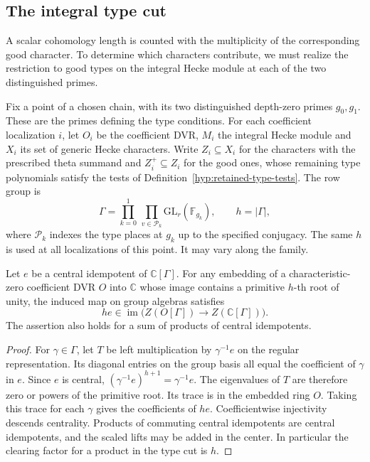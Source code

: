 \subsection{The integral type cut}\label{subsec:selected-cut}
\hypertarget{source-selected-cut}{}

A scalar cohomology length is counted with the multiplicity of the corresponding good character. To determine which characters contribute, we must realize the restriction to good types on the integral Hecke module at each of the two distinguished primes.

\begin{definition}\label{def:localized-type-support}
Fix a point of a chosen chain, with its two distinguished depth-zero
primes \(g_0,g_1\). These are the primes defining the type conditions.
For each coefficient localization \(i\), let \(O_i\) be the coefficient
DVR, \(M_i\) the integral Hecke module and \(X_i\) its set of generic
Hecke characters. Write \(Z_i\subseteq X_i\) for the characters with
the prescribed theta summand and \(Z_i^+\subseteq Z_i\) for the good
ones, whose remaining type polynomials satisfy the tests of Definition~\ref{hyp:retained-type-tests}. The row group is
\[
 \Gamma=\prod_{k=0}^1\,\prod_{v\in\mathcal P_k}
              \mathrm{GL}_r(\mathbb F_{g_k}),\qquad h=|\Gamma|,
\]
where \(\mathcal P_k\) indexes the type places at \(g_k\) up to the
specified conjugacy. The same \(h\) is used at all localizations of
this point. It may vary along the family.
\end{definition}

\begin{lemma}\label{lem:integral-central}
Let \(e\) be a central idempotent of \(\mathbb C[\Gamma]\). For any
embedding of a characteristic-zero coefficient DVR \(O\) into \(\mathbb C\) whose image contains a primitive \(h\)-th root of unity, the induced map on group algebras satisfies
\[
 he\in\operatorname{im}\bigl(Z(O[\Gamma])\longrightarrow Z(\mathbb C[\Gamma])\bigr).
\]
The assertion also holds for a sum of products of central
idempotents.
\end{lemma}

\begin{proof}
For \(\gamma\in\Gamma\), let \(T\) be left multiplication by
\(\gamma^{-1}e\) on the regular representation. Its diagonal entries
on the group basis all equal the coefficient of \(\gamma\) in \(e\).
Since \(e\) is central, \((\gamma^{-1}e)^{h+1}=\gamma^{-1}e\).
The eigenvalues of \(T\) are therefore zero or powers of the
primitive root. Its trace is in the embedded ring \(O\). Taking
this trace for each \(\gamma\) gives the coefficients of \(he\).
Coefficientwise injectivity descends centrality. Products of
commuting central idempotents are central idempotents, and the
scaled lifts may be added in the center. In particular the
clearing factor for a product in the type cut is \(h\).
\end{proof}

